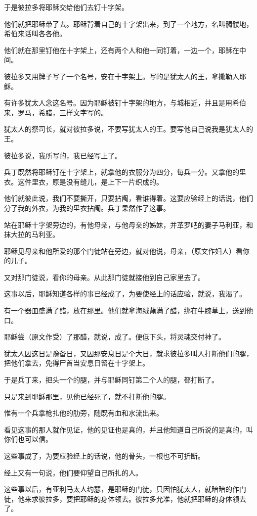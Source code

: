 \documentclass[12pt,oneside]{book}
\begin{document}
于是彼拉多将耶稣交给他们去钉十字架。

他们就把耶稣带了去。耶稣背着自己的十字架出来，到了一个地方，名叫髑髅地，希伯来话叫各各他。

他们就在那里钉他在十字架上，还有两个人和他一同钉着，一边一个，耶稣在中间。

彼拉多又用牌子写了一个名号，安在十字架上。写的是犹太人的王，拿撒勒人耶稣。

有许多犹太人念这名号。因为耶稣被钉十字架的地方，与城相近，并且是用希伯来，罗马，希腊，三样文字写的。

犹太人的祭司长，就对彼拉多说，不要写犹太人的王。要写他自己说我是犹太人的王。

彼拉多说，我所写的，我已经写上了。

兵丁既然将耶稣钉在十字架上，就拿他的衣服分为四分，每兵一分。又拿他的里衣。这件里衣，原是没有缝儿，是上下一片织成的。

他们就彼此说，我们不要撕开，只要拈阄，看谁得着。这要应验经上的话说，他们分了我的外衣，为我的里衣拈阄。兵丁果然作了这事。

站在耶稣十字架旁边的，有他母亲，与他母亲的姊妹，并革罗吧的妻子马利亚，和抹大拉的马利亚。

耶稣见母亲和他所爱的那个门徒站在旁边，就对他说，母亲，（原文作妇人）看你的儿子。

又对那门徒说，看你的母亲。从此那门徒就接他到自己家里去了。

这事以后，耶稣知道各样的事已经成了，为要使经上的话应验，就说，我渴了。

有一个器皿盛满了醋，放在那里。他们就拿海绒蘸满了醋，绑在牛膝草上，送到他口。

耶稣尝（原文作受）了那醋，就说，成了。便低下头，将灵魂交付神了。

犹太人因这日是豫备日，又因那安息日是个大日，就求彼拉多叫人打断他们的腿，把他们拿去，免得尸首当安息日留在十字架上。

于是兵丁来，把头一个的腿，并与耶稣同钉第二个人的腿，都打断了。

只是来到耶稣那里，见他已经死了，就不打断他的腿。

惟有一个兵拿枪扎他的肋旁，随既有血和水流出来。

看见这事的那人就作见证，他的见证也是真的，并且他知道自己所说的是真的，叫你们也可以信。

这些事成了，为要应验经上的话说，他的骨头，一根也不可折断。

经上又有一句说，他们要仰望自己所扎的人。

这些事以后，有亚利马太人约瑟，是耶稣的门徒，只因怕犹太人，就暗暗的作门徒，他来求彼拉多，要把耶稣的身体领去。彼拉多允准，他就把耶稣的身体领去了。
\end{document}

